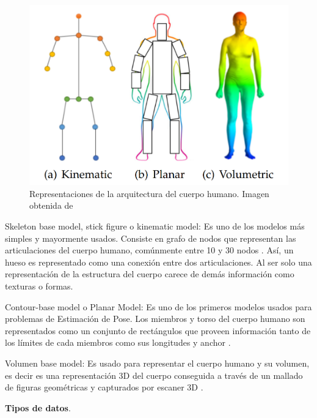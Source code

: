 \begin{figure}[ht!]
    \centering
    \includegraphics[width=0.7 \textwidth]{Chapters/1. Pose Estimation/figures/body_model.png}
    \caption{Representaciones de la arquitectura del cuerpo humano. Imagen obtenida de \citeauthor{DBLP:journals/corr/FangXL16}}
    \label{fig:alphapose}
\end{figure}


Skeleton base model, stick figure o kinematic model:
Es uno de los modelos más simples y mayormente usados. Consiste en grafo de nodos que representan
las articulaciones del cuerpo humano, comúnmente entre 10 y 30 nodos \cite{Felzenszwalb2005}.
Así, un hueso es representado como una conexión entre dos articulaciones. Al ser solo una
representación de la estructura del cuerpo carece de demás información como texturas o formas.

Contour-base model o Planar Model:
Es uno de los primeros modelos usados para problemas de Estimación de Pose. Los miembros y torso del
cuerpo humano son representados como un conjunto de rectángulos que proveen información tanto de los
límites de cada miembros como sus longitudes y anchor \cite{557241} \cite{COOTES199538}.

Volumen base model:
Es usado para representar el cuerpo humano y su volumen, es decir es una representación 3D del
cuerpo conseguida a través de un mallado de figuras geométricas y capturados por escaner 3D
\cite{840661}.

\textbf{Tipos de datos}.

